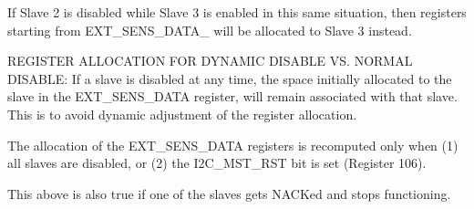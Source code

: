 If Slave 2 is disabled while Slave 3 is enabled in this same situation, then registers starting from E\+X\+T\+\_\+\+S\+E\+N\+S\+\_\+\+D\+A\+T\+A\+\_ will be allocated to Slave 3 instead.

R\+E\+G\+I\+S\+T\+E\+R A\+L\+L\+O\+C\+A\+T\+I\+O\+N F\+O\+R D\+Y\+N\+A\+M\+I\+C D\+I\+S\+A\+B\+L\+E V\+S. N\+O\+R\+M\+A\+L D\+I\+S\+A\+B\+L\+E\+: If a slave is disabled at any time, the space initially allocated to the slave in the E\+X\+T\+\_\+\+S\+E\+N\+S\+\_\+\+D\+A\+T\+A register, will remain associated with that slave. This is to avoid dynamic adjustment of the register allocation.

The allocation of the E\+X\+T\+\_\+\+S\+E\+N\+S\+\_\+\+D\+A\+T\+A registers is recomputed only when (1) all slaves are disabled, or (2) the I2\+C\+\_\+\+M\+S\+T\+\_\+\+R\+S\+T bit is set (Register 106).

This above is also true if one of the slaves gets N\+A\+C\+Ked and stops functioning.


